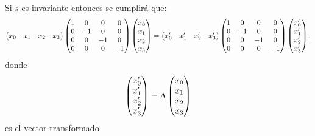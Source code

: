 \documentclass{article}
\theoremstyle{plain}
\theoremstyle{definition}
\begin{document}
	Si \(s\)  es invariante entonces se cumplirá que:
	\begin{dmath}\label{NormPreserveMinkowski}
		\left(\begin{array}{@{}cccc@{}}
			x_0&x_1&x_2&x_3\\
		\end{array} \right)
		\left(\begin{array}{@{}cccc@{}}
			1 & 0 &0&0 \\
			0 & -1 &0&0 \\
			0 & 0 &-1&0 \\
			0 & 0 &0&-1 \\
		\end{array} \right)
		\left(\begin{array}{@{}c@{}}
			x_0\\x_1\\x_2\\x_3\\
		\end{array} \right)
		=
		\left(\begin{array}{@{}cccc@{}}
			x^\prime_0&x^\prime_1&x^\prime_2&x^\prime_3\\
		\end{array} \right)
		\left(\begin{array}{@{}cccc@{}}
			1 & 0 &0&0 \\
			0 & -1 &0&0 \\
			0 & 0 &-1&0 \\
			0 & 0 &0&-1 \\
		\end{array} \right)
		\left(\begin{array}{@{}c@{}}
			x^\prime_0\\x^\prime_1\\x^\prime_2\\x^\prime_3\\
		\end{array} \right),
	\end{dmath}
	donde
	\[
	\left(\begin{array}{@{}c@{}}
	x^\prime_0\\x^\prime_1\\x^\prime_2\\x^\prime_3\\
	\end{array} \right) = \Lambda \left(\begin{array}{@{}c@{}}
	x_0\\x_1\\x_2\\x_3\\
	\end{array} \right) 
	\] es el vector transformado
\end{document}
